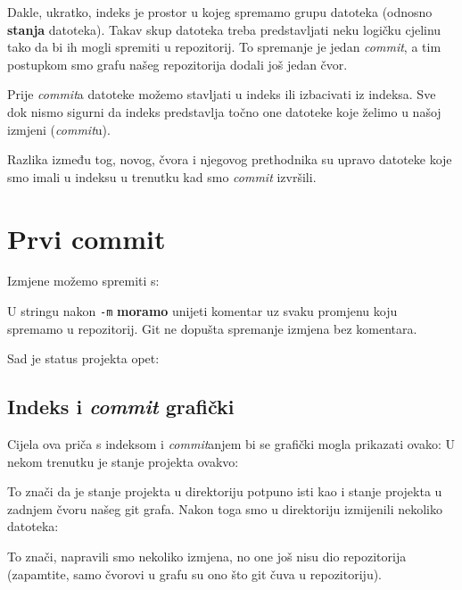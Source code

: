 
Dakle, ukratko, indeks je prostor u kojeg spremamo grupu datoteka (odnosno \textbf{stanja} datoteka).
Takav skup datoteka treba predstavljati neku logičku cjelinu tako da bi ih mogli spremiti u repozitorij.
To spremanje je jedan \emph{commit}, a tim postupkom smo grafu našeg repozitorija dodali još jedan čvor. 

Prije \emph{commit}a datoteke možemo stavljati u indeks ili izbacivati iz indeksa.
Sve dok nismo sigurni da indeks predstavlja točno one datoteke koje želimo u našoj izmjeni (\emph{commit}u).

Razlika između tog, novog, čvora i njegovog prethodnika su upravo datoteke koje smo imali u indeksu u trenutku kad smo \emph{commit} izvršili.

\section*{Prvi commit}

Izmjene možemo spremiti s:


U stringu nakon \verb+-m+ \textbf{moramo} unijeti komentar uz svaku promjenu koju spremamo u repozitorij.
Git ne dopušta spremanje izmjena bez komentara.

Sad je status projekta opet:



\subsection*{Indeks i \emph{commit} grafički}

Cijela ova priča s indeksom i \emph{commit}anjem bi se grafički mogla prikazati ovako:
U nekom trenutku je stanje projekta ovakvo:



To znači da je stanje projekta u direktoriju potpuno isti kao i stanje projekta u zadnjem čvoru našeg git grafa.
Nakon toga smo u direktoriju izmijenili nekoliko datoteka:



To znači, napravili smo nekoliko izmjena, no one još nisu dio repozitorija (zapamtite, samo čvorovi u grafu su ono što git čuva u repozitoriju).

